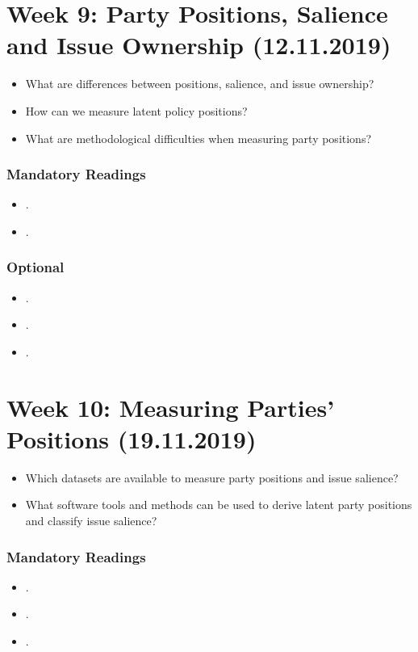 \documentclass[abstract=on,parskip=full,headings=standardclasses,fontsize=11pt,paper=a4]{scrartcl}
\begin{document}
\section{Week 9:  Party Positions, Salience and Issue Ownership (12.11.2019)}


\begin{itemize}
\renewcommand\labelitemi{--}
\item What are differences between positions, salience, and issue ownership?
\item How can we measure latent policy positions? 
\item What are methodological difficulties when measuring party positions?
\end{itemize}

\subsubsection*{Mandatory Readings}
\begin{itemize}
\item {}.
\item {}.
\end{itemize}


\subsubsection*{Optional}
\begin{itemize}
\item {}.
\item {}.
\item {}.
\end{itemize}


\section{Week 10:  Measuring Parties' Positions (19.11.2019)}

\begin{itemize}
\renewcommand\labelitemi{--}
\item Which datasets are available to measure party positions and issue salience?
\item What software tools and methods can be used to derive latent party positions and classify issue salience?
\end{itemize}


\subsubsection*{Mandatory Readings}
\begin{itemize}
\item {}.
\item {}.
\item {}.
\end{itemize}
\end{document}
